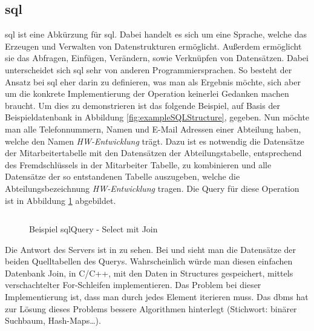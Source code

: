 \subsection{\acs{sql}}\label{subsec:sql}
\acs{sql} ist eine Abkürzung für \acl{sql}. Dabei handelt es sich um eine Sprache, 
welche das Erzeugen und Verwalten von Datenstrukturen ermöglicht. 
Außerdem ermöglicht sie das Abfragen, Einfügen, Verändern, sowie Verknüpfen von Datensätzen.
Dabei unterscheidet sich \ac{sql} sehr von anderen Programmiersprachen.
So besteht der Ansatz bei \ac{sql} eher darin zu definieren, was man als Ergebnis möchte, 
sich aber um die konkrete Implementierung der Operation keinerlei Gedanken machen braucht.
Um dies zu demonstrieren ist das folgende Beispiel, auf Basis der Beispieldatenbank in Abbildung \ref{fig:exampleSQLStructure}, gegeben.
Nun möchte man alle Telefonnummern, Namen und E-Mail Adressen einer Abteilung haben, welche den Namen \emph{HW-Entwicklung} trägt.
Dazu ist es notwendig die Datensätze der Mitarbeitertabelle mit den Datensätzen der Abteilungstabelle, 
entsprechend des Fremdschlüssels in der Mitarbeiter Tabelle, zu kombinieren und alle Datensätze der so entstandenen Tabelle auszugeben, 
welche die Abteilungsbezeichnung \emph{HW-Entwicklung} tragen. 
Die Query für diese Operation ist in Abbildung \ref{fig:exampleSQLQuery} abgebildet.
\begin{figure}[hbt]
  \inputminted{sql}{content/hauptteil/theoretischeGrundlagen/rec/sqlQuery.sql}
  \caption{Beispiel sqlQuery - Select mit Join}
  \label{fig:exampleSQLQuery}
\end{figure}
Die Antwort des Servers ist in  zu sehen.
Bei  und  sieht man die Datensätze der beiden Quelltabellen des Querys.
Wahrscheinlich würde man diesen einfachen Datenbank Join, in C/C++, mit den Daten in Structures gespeichert, mittels verschachtelter For-Schleifen implementieren. 
Das Problem bei dieser Implementierung ist, dass man durch jedes Element iterieren muss.
Das \ac{dbms} hat zur Lösung dieses Problems bessere Algorithmen hinterlegt (Stichwort: binärer Suchbaum, Hash-Maps\dots).


